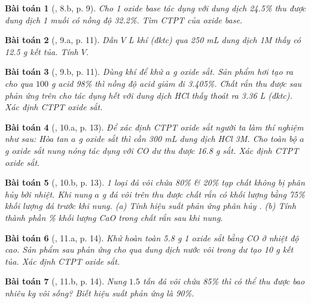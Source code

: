 \documentclass{article}
\newtheorem{baitoan}{Bài toán}
\begin{document}
\begin{baitoan}[\cite{An_350_BT_Hoa_Hoc_9}, 8.b, p. 9]
	Cho 1 oxide base tác dụng với dung dịch \emph{ 24.5\%} thu được dung dịch 1 muối có nồng độ \emph{32.2\%}. Tìm CTPT của oxide base.
\end{baitoan}

\begin{baitoan}[\cite{An_350_BT_Hoa_Hoc_9}, 9.a, p. 11]
	Dẫn $V$ \emph{L} khí \emph{} (đktc) qua \emph{250 mL} dung dịch \emph{ 1M} thấy có \emph{12.5 g} kết tủa. Tính $V$.
\end{baitoan}

\begin{baitoan}[\cite{An_350_BT_Hoa_Hoc_9}, 9.b, p. 11]
	Dùng khí \emph{} để khử $a$ \emph{g} oxide sắt. Sản phẩm hơi tạo ra cho qua $100$ \emph{g} acid \emph{ 98\%} thì nồng độ acid giảm đi \emph{3.405\%}. Chất rắn thu được sau phản ứng trên cho tác dụng hết với dung dịch \emph{HCl} thấy thoát ra \emph{3.36 L} \emph{} (đktc). Xác định CTPT oxide sắt.
\end{baitoan}

\begin{baitoan}[\cite{An_350_BT_Hoa_Hoc_9}, 10.a, p. 13]
	Để xác định CTPT oxide sắt người ta làm thí nghiệm như sau: Hòa tan $a$ \emph{g} oxide sắt thì cần \emph{300 mL} dung dịch \emph{HCl 3M}. Cho toàn bộ $a$ \emph{g} oxide sắt nung nóng tác dụng với \emph{CO} dư thu được \emph{16.8 g} sắt. Xác định CTPT oxide sắt.
\end{baitoan}

\begin{baitoan}[\cite{An_350_BT_Hoa_Hoc_9}, 10.b, p. 13]
	1 loại đá vôi chứa \emph{80\% } \& \emph{20\%} tạp chất không bị phân hủy bởi nhiệt. Khi nung $a$ \emph{g} đá vôi trên thu được chất rắn có khối lượng bằng \emph{75\%} khối lượng đá trước khi nung. (a) Tính hiệu suất phản ứng phân hủy \emph{}. (b) Tính thành phần \% khối lượng \emph{CaO} trong chất rắn sau khi nung.
\end{baitoan}

\begin{baitoan}[\cite{An_350_BT_Hoa_Hoc_9}, 11.a, p. 14]
	Khử hoàn toàn \emph{5.8 g} 1 oxide sắt bằng \emph{CO} ở nhiệt độ cao. Sản phẩm sau phản ứng cho qua dung dịch nước vôi trong dư tạo \emph{10 g} kết tủa. Xác định CTPT oxide sắt.
\end{baitoan}

\begin{baitoan}[\cite{An_350_BT_Hoa_Hoc_9}, 11.b, p. 14]
	Nung $1.5$ tấn đá vôi chứa \emph{85\% } thì có thể thu được bao nhiêu \emph{kg} vôi sống? Biết hiệu suất phản ứng là \emph{90\%}.
\end{baitoan}
\end{document}
